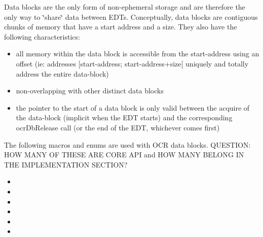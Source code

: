 Data blocks are the only form of non-\/ephemeral storage and are therefore
the only way to \char`\"{}share\char`\"{} data between E\-D\-Ts. Conceptually, data blocks
are contiguous chunks of memory that have a start address and a size. They also have the following characteristics\-:
\begin{itemize}
\item all memory within the data block is accessible from the start-\/address using an
 offset (ie\-: addresses \mbox{[}start-\/address; start-\/address+size\mbox{[} uniquely and
totally address the entire data-\/block)
\item non-\/overlapping with other distinct data blocks
\item the pointer to the start of a data block is only valid between the acquire of
the data-\/block (implicit when the E\-D\-T starts) and the corresponding ocr\-Db\-Release
 call (or the end of the E\-D\-T, whichever comes first)
\end{itemize}

The following macros and enums  are used with OCR data blocks.  QUESTION: HOW MANY OF THESE
ARE CORE API and HOW MANY BELONG IN THE IMPLEMENTATION SECTION?
\begin{itemize}
\item {}
\item {}
\item {}
\item {}
\item {}
\item {}
\end{itemize}


